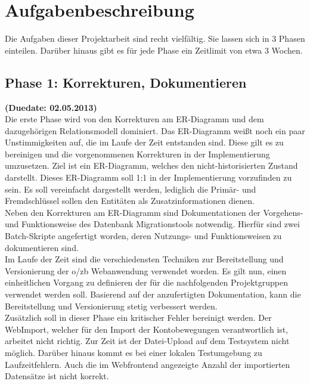 \documentclass[12pt,             %
               a4paper,          %
               listof=totoc,     %
               index=totoc,      %
               bibliography=totoc,%
               oneside,         %
               BCOR1cm,          %
               english   %
               ]{scrbook}
\begin{document}
\section{Aufgabenbeschreibung}
Die Aufgaben dieser Projektarbeit sind recht vielfältig. Sie lassen sich in 3 Phasen einteilen. Darüber hinaus gibt es für jede Phase ein Zeitlimit von etwa 3 Wochen.

\subsection{Phase 1: Korrekturen, Dokumentieren}
\textbf {(Duedate: 02.05.2013)}\\
Die erste Phase wird von den Korrekturen am ER-Diagramm und dem dazugehörigen Relationsmodell dominiert. Das ER-Diagramm weißt noch ein paar Unstimmigkeiten auf, die im Laufe der Zeit entstanden sind. Diese gilt es zu bereinigen und die vorgenommenen Korrekturen in der Implementierung umzusetzen. Ziel ist ein ER-Diagramm, welches den nicht-historisierten Zustand darstellt. Dieses ER-Diagramm soll 1:1 in der Implementierung vorzufinden zu sein. Es soll vereinfacht dargestellt werden, lediglich die Primär- und Fremdschlüssel sollen den Entitäten als Zusatzinformationen dienen.\\

Neben den Korrekturen am ER-Diagramm sind Dokumentationen der Vorgehens- und Funktionsweise des Datenbank Migrationstools notwendig. Hierfür sind zwei Batch-Skripte angefertigt worden, deren Nutzungs- und Funktionsweisen zu dokumentieren sind.\\

Im Laufe der Zeit sind die verschiedensten Techniken zur Bereitstellung und Versionierung der o/zb Webanwendung verwendet worden. Es gilt nun, einen einheitlichen Vorgang zu definieren der für die nachfolgenden Projektgruppen verwendet werden soll. Basierend auf der anzufertigten Dokumentation, kann die Bereitstellung und Versionierung stetig verbessert werden.\\

Zusätzlich soll in dieser Phase ein kritischer Fehler bereinigt werden. Der WebImport, welcher für den Import der Kontobewegungen verantwortlich ist, arbeitet nicht richtig. Zur Zeit ist der Datei-Upload auf dem Testsystem nicht möglich. Darüber hinaus kommt es bei einer lokalen Testumgebung zu Laufzeitfehlern. Auch die im Webfrontend angezeigte Anzahl der importierten Datensätze ist nicht korrekt.
\end{document}
